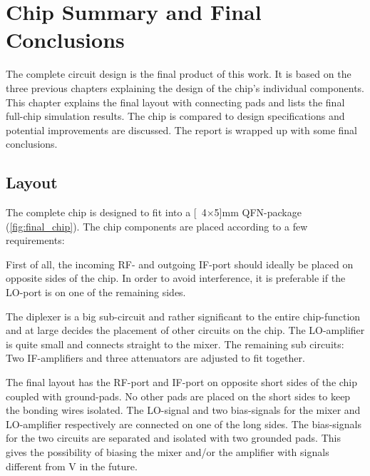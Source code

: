 \chapter{Chip Summary and Final Conclusions}

		The complete circuit design is the final product of this work. It is based on the three previous chapters explaining the design of the chip's individual components. This chapter explains the final layout with connecting pads and lists the final full-chip simulation results. The chip is compared to design specifications and potential improvements are discussed. The report is wrapped up with some final conclusions.


	\section{Layout}
		The complete chip is designed to fit into a \unit[4$\times$5]{mm} QFN-package (\autoref{fig:final_chip}). The chip components are placed according to a few requirements:

		First of all, the incoming RF- and outgoing IF-port should ideally be placed on opposite sides of the chip. In order to avoid interference, it is preferable if the LO-port is on one of the remaining sides. %

		The diplexer is a big sub-circuit and rather significant to the entire chip-function and at large decides the placement of other circuits on the chip. The LO-amplifier is quite small and connects straight to the mixer. The remaining sub circuits: Two IF-amplifiers and three attenuators are adjusted to fit together.

		The final layout has the RF-port and IF-port on opposite short sides of the chip coupled with ground-pads. No other pads are placed on the short sides to keep the bonding wires isolated. The LO-signal and two bias-signals for the mixer and LO-amplifier respectively are connected on one of the long sides. The bias-signals for the two circuits are separated and isolated with two grounded pads. This gives the possibility of biasing the mixer and/or the amplifier with signals different from \unit[5]{V} in the future.

